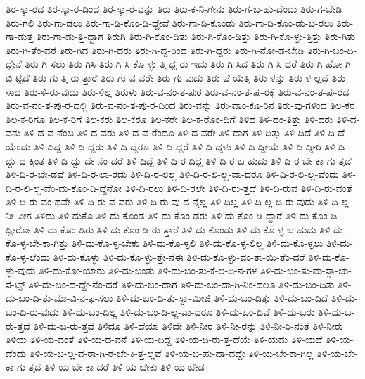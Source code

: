 {ತಿರ-ಸ್ಕಾ-ರದ
ತಿರ-ಸ್ಕಾ-ರ-ದಿಂದ
ತಿರ-ಸ್ಕಾ-ರ-ವನ್ನು
ತಿರು
ತಿರು-ಕ-ನಿ-ಗೇನು
ತಿರು-ಗ-ಬ-ಹು-ದೆಂದು
ತಿರು-ಗ-ಬೇಡಿ
ತಿರು-ಗಲಿ
ತಿರು-ಗಾ-ಡಲು
ತಿರು-ಗಾ-ಡಿ-ಕೊಂ-ಡಿ-ದ್ದೇವೆ
ತಿರು-ಗಾ-ಡಿ-ಕೊಂಡು
ತಿರು-ಗಾ-ಡಿ-ಕೊಂ-ಡು-ಬ-ರಲು
ತಿರು-ಗಾ-ಡುತ್ತ
ತಿರು-ಗಾ-ಡು-ತ್ತಿ-ದ್ದಾಗ
ತಿರುಗಿ
ತಿರು-ಗಿ-ಕೊಂ-ಡಿತು
ತಿರು-ಗಿ-ಕೊಂ-ಡಿತ್ತು
ತಿರು-ಗಿ-ಕೊ-ಳ್ಳು-ತ್ತಿತ್ತು
ತಿರು-ಗಿತು
ತಿರು-ಗಿ-ತೆಂ-ದರೆ
ತಿರು-ಗಿದ
ತಿರು-ಗಿ-ದರು
ತಿರು-ಗಿ-ದ್ದ-ರಿಂದ
ತಿರು-ಗಿ-ದ್ದರು
ತಿರು-ಗಿ-ನೋ-ಡ-ಬೇಡಿ
ತಿರು-ಗಿ-ಬಂ-ದಿ-ದ್ದೇನೆ
ತಿರು-ಗಿ-ಸಲು
ತಿರು-ಗಿಸಿ
ತಿರು-ಗಿ-ಸಿ-ಕೊ-ಳ್ಳು-ತ್ತಿ-ದ್ದ-ರು-ಇದು
ತಿರು-ಗಿ-ಸಿದ
ತಿರು-ಗಿ-ಸಿ-ದರೆ
ತಿರು-ಗಿ-ಹೋ-ಗಿ-ಬಿ-ಟ್ಟಿದೆ
ತಿರು-ಗು-ತ್ತಿ-ರು-ತ್ತಾರೆ
ತಿರು-ಗು-ವ-ವರೇ
ತಿರು-ಗು-ವುದು
ತಿರು-ಪೆ-ಯೆತ್ತಿ
ತಿರು-ಳನ್ನು
ತಿರು-ಳ-ಲ್ಲದೆ
ತಿರು-ಳಾದ
ತಿರು-ಳಿ-ರು-ವುದು
ತಿರು-ಳಿಲ್ಲ
ತಿರುಳು
ತಿರು-ವ-ನಂ-ತ-ಪುರ
ತಿರು-ವ-ನಂ-ತ-ಪು-ರಕ್ಕೆ
ತಿರು-ವ-ನಂ-ತ-ಪು-ರದ
ತಿರು-ವ-ನಂ-ತ-ಪು-ರ-ದಲ್ಲಿ
ತಿರು-ವ-ನಂ-ತ-ಪು-ರ-ದಿಂದ
ತಿರು-ವನ್ನು
ತಿರು-ವಾಂ-ಕೂ-ರಿನ
ತಿರು-ವು-ಗಳಿಂದ
ತಿಲ-ಕರ
ತಿಲ-ಕ-ರಿಗೂ
ತಿಲ-ಕ-ರಿಗೆ
ತಿಲ-ಕರು
ತಿಲ-ಕರೂ
ತಿಲ-ಕರೇ
ತಿಲ-ಕ-ರೊಂ-ದಿಗೆ
ತಿಳಿದ
ತಿಳಿ-ದಂ-ತಿತ್ತು
ತಿಳಿ-ದರು
ತಿಳಿ-ದ-ವನು
ತಿಳಿ-ದ-ವ-ನೆಂಬ
ತಿಳಿ-ದ-ವರು
ತಿಳಿ-ದ-ವ-ರೆಂದೂ
ತಿಳಿ-ದ-ವರೇ
ತಿಳಿ-ದಾಗ
ತಿಳಿ-ದಿತ್ತು
ತಿಳಿ-ದಿದೆ
ತಿಳಿ-ದಿ-ದೆ-ಯೆಂದು
ತಿಳಿ-ದಿದ್ದ
ತಿಳಿ-ದಿ-ದ್ದರು
ತಿಳಿ-ದಿ-ದ್ದರೂ
ತಿಳಿ-ದಿ-ದ್ದರೆ
ತಿಳಿ-ದಿ-ದ್ದಳು
ತಿಳಿ-ದಿ-ದ್ದೀಯೆ
ತಿಳಿ-ದಿ-ದ್ದೀರಿ
ತಿಳಿ-ದಿ-ದ್ದು-ದ-ಕ್ಕಿಂತ
ತಿಳಿ-ದಿ-ದ್ದು-ದೇ-ನೆಂ-ದರೆ
ತಿಳಿ-ದಿದ್ದೆ
ತಿಳಿ-ದಿ-ರ-ದಿದ್ದ
ತಿಳಿ-ದಿ-ರ-ಬ-ಹುದು
ತಿಳಿ-ದಿ-ರ-ಬೇ-ಕಾ-ಗು-ತ್ತದೆ
ತಿಳಿ-ದಿ-ರ-ಬೇ-ಡವೆ
ತಿಳಿ-ದಿ-ರ-ಲಾ-ರದು
ತಿಳಿ-ದಿ-ರ-ಲಿಲ್ಲ
ತಿಳಿ-ದಿ-ರ-ಲಿ-ಲ್ಲ-ವಾ-ದರೂ
ತಿಳಿ-ದಿ-ರ-ಲಿ-ಲ್ಲ-ವೆಂದು
ತಿಳಿ-ದಿ-ರ-ಲಿ-ಲ್ಲ-ವೆಂ-ದು-ಕೊಂ-ಡಿ-ದ್ದೆನೋ
ತಿಳಿ-ದಿ-ರಲು
ತಿಳಿ-ದಿ-ರಲೇ
ತಿಳಿ-ದಿ-ರು-ತ್ತದೆ
ತಿಳಿ-ದಿ-ರುವ
ತಿಳಿ-ದಿ-ರು-ವಂತೆ
ತಿಳಿ-ದಿ-ರು-ವಂ-ಥವೇ
ತಿಳಿ-ದಿ-ರು-ವ-ವರು
ತಿಳಿ-ದಿ-ರು-ವು-ದ-ನ್ನೆಲ್ಲ
ತಿಳಿ-ದಿಲ್ಲ
ತಿಳಿ-ದಿ-ಲ್ಲ-ದಿ-ರು-ವುದು
ತಿಳಿ-ದಿ-ಲ್ಲ-ನೀ-ವೀಗ
ತಿಳಿದು
ತಿಳಿ-ದುಕೊ
ತಿಳಿ-ದು-ಕೊಂಡ
ತಿಳಿ-ದು-ಕೊಂ-ಡರು
ತಿಳಿ-ದು-ಕೊಂ-ಡಿ-ದ್ದಾರೆ
ತಿಳಿ-ದು-ಕೊಂ-ಡಿ-ದ್ದೀರೋ
ತಿಳಿ-ದು-ಕೊಂ-ಡಿರು
ತಿಳಿ-ದು-ಕೊಂ-ಡಿ-ರು-ತ್ತಾರೆ
ತಿಳಿ-ದು-ಕೊಂಡು
ತಿಳಿ-ದು-ಕೊ-ಳ್ಳ-ಬ-ಹುದು
ತಿಳಿ-ದು-ಕೊ-ಳ್ಳ-ಬೇ-ಕಾ-ಗಿತ್ತು
ತಿಳಿ-ದು-ಕೊ-ಳ್ಳ-ಬೇಕು
ತಿಳಿ-ದು-ಕೊ-ಳ್ಳಲಿ
ತಿಳಿ-ದು-ಕೊ-ಳ್ಳ-ಲಿಲ್ಲ
ತಿಳಿ-ದು-ಕೊ-ಳ್ಳಲು
ತಿಳಿ-ದು-ಕೊ-ಳ್ಳ-ಲೆಂದು
ತಿಳಿ-ದು-ಕೊಳ್ಳು
ತಿಳಿ-ದು-ಕೊ-ಳ್ಳು-ತ್ತೇ-ನೆಈ
ತಿಳಿ-ದು-ಕೊ-ಳ್ಳು-ವಂ-ತಾ-ಯಿ-ತೆಂ-ದರೆ
ತಿಳಿ-ದು-ಕೊ-ಳ್ಳು-ವುದು
ತಿಳಿ-ದು-ಕೋ-ಯಾರು
ತಿಳಿ-ದು-ಬಂತು
ತಿಳಿ-ದು-ಬಂ-ತು-ಕೆ-ಲ-ದಿ-ನ-ಗಳ
ತಿಳಿ-ದು-ಬಂ-ತು-ಮ-ಸ್ಸಾ-ಚು-ಸೆ-ಟ್ಸ್
ತಿಳಿ-ದು-ಬಂ-ದ-ದ್ದೇ-ನೆಂ-ದರೆ
ತಿಳಿ-ದು-ಬಂ-ದಾಗ
ತಿಳಿ-ದು-ಬಂ-ದಾ-ಗಿ-ನಿಂ-ದಲೂ
ತಿಳಿ-ದು-ಬಂ-ದಿತು
ತಿಳಿ-ದು-ಬಂ-ದಿ-ತು-ಮಾ-ವಿ-ನ-ಫ-ಸಲು
ತಿಳಿ-ದು-ಬಂ-ದಿ-ತು-ಸ್ವಾ-ಮೀಜಿ
ತಿಳಿ-ದು-ಬಂ-ದಿತ್ತು
ತಿಳಿ-ದು-ಬಂ-ದಿದೆ
ತಿಳಿ-ದು-ಬಂ-ದಿ-ರು-ವುದು
ತಿಳಿ-ದು-ಬಂ-ದಿಲ್ಲ
ತಿಳಿ-ದು-ಬಂ-ದಿ-ಲ್ಲ-ವಾ-ದರೂ
ತಿಳಿ-ದು-ಬಂ-ದಿವೆ
ತಿಳಿ-ದು-ಬರು
ತಿಳಿ-ದು-ಬ-ರು-ತ್ತದೆ
ತಿಳಿ-ದು-ಬ-ರು-ತ್ತವೆ
ತಿಳಿದೂ
ತಿಳಿ-ದೆಯಾ
ತಿಳಿದೇ
ತಿಳಿ-ನೀರ
ತಿಳಿ-ನೀ-ರನ್ನು
ತಿಳಿ-ನೀ-ರಿ-ನಂತೆ
ತಿಳಿ-ನೀರು
ತಿಳಿಯ
ತಿಳಿ-ಯ-ದಂತೆ
ತಿಳಿ-ಯ-ದ-ವನೆ
ತಿಳಿ-ಯ-ದಿದ್ದ
ತಿಳಿ-ಯ-ದಿ-ರು-ತ್ತ-ದೆಯೆ
ತಿಳಿ-ಯದು
ತಿಳಿ-ಯದೆ
ತಿಳಿ-ಯ-ದೆಂದು
ತಿಳಿ-ಯ-ಬ-ಲ್ಲ-ವ-ರಾ-ಗಿ-ರ-ಬೇ-ಕಿ-ತ್ತ-ಲ್ಲವೆ
ತಿಳಿ-ಯ-ಬ-ಹು-ದಾ-ದದ್ದೇ
ತಿಳಿ-ಯ-ಬೇ-ಕಾ-ಗಿಲ್ಲ
ತಿಳಿ-ಯ-ಬೇ-ಕಾ-ಗು-ತ್ತದೆ
ತಿಳಿ-ಯ-ಬೇ-ಕಾ-ದರೆ
ತಿಳಿ-ಯ-ಬೇಕು
ತಿಳಿ-ಯ-ಬೇಡ
}
